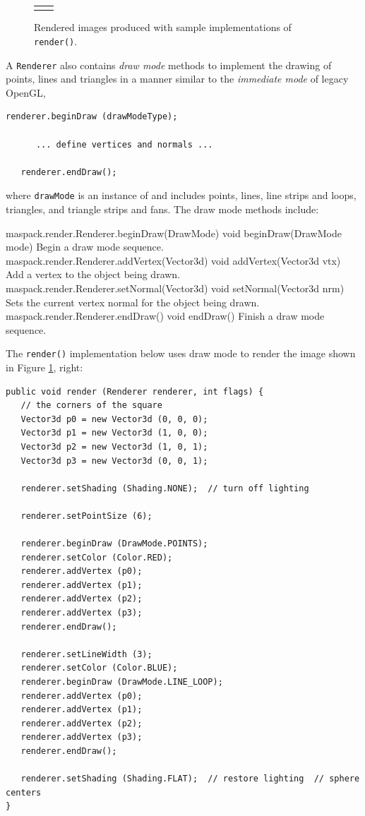 \begin{figure}[ht]
\begin{center}
\begin{tabular}{cc}
\fi
\end{tabular}
\end{center}
\caption{Rendered images produced with sample implementations of {\tt render()}.}
\label{renderExamples:fig}
\end{figure}

A {\tt Renderer} also contains {\it draw mode} methods to implement the drawing of points,
lines and triangles in a manner similar to the {\it immediate mode} of legacy OpenGL,
%
\begin{lstlisting}[]
   renderer.beginDraw (drawModeType);

      ... define vertices and normals ...

   renderer.endDraw();
\end{lstlisting}
%
where {\tt drawMode} is an instance
of  and includes points,
lines, line strips and loops, triangles, and triangle strips and
fans. The draw mode methods include:
%
\begin{methodtable}{0.48}{0.52}
\midline
%
\methodentry
{maspack.render.Renderer.beginDraw(DrawMode)}%
{void beginDraw(DrawMode mode)}%
{Begin a draw mode sequence.}%
%
\methodentry
{maspack.render.Renderer.addVertex(Vector3d)}%
{void addVertex(Vector3d vtx)}%
{Add a vertex to the object being drawn.}%
%
\methodentry
{maspack.render.Renderer.setNormal(Vector3d)}%
{void setNormal(Vector3d nrm)}%
{Sets the current vertex normal for the object being drawn.}%
%
\methodentry
{maspack.render.Renderer.endDraw()}%
{void endDraw()}%
{Finish a draw mode sequence.}%
%
\midline
\end{methodtable}
%
The {\tt render()} implementation below uses draw mode to
render the image shown in Figure \ref{renderExamples:fig}, right:
%
\begin{lstlisting}[]
public void render (Renderer renderer, int flags) {
   // the corners of the square
   Vector3d p0 = new Vector3d (0, 0, 0);
   Vector3d p1 = new Vector3d (1, 0, 0);
   Vector3d p2 = new Vector3d (1, 0, 1);
   Vector3d p3 = new Vector3d (0, 0, 1);
   
   renderer.setShading (Shading.NONE);  // turn off lighting

   renderer.setPointSize (6);

   renderer.beginDraw (DrawMode.POINTS);
   renderer.setColor (Color.RED);
   renderer.addVertex (p0);
   renderer.addVertex (p1);
   renderer.addVertex (p2);
   renderer.addVertex (p3);
   renderer.endDraw();

   renderer.setLineWidth (3);
   renderer.setColor (Color.BLUE);
   renderer.beginDraw (DrawMode.LINE_LOOP);
   renderer.addVertex (p0);
   renderer.addVertex (p1);
   renderer.addVertex (p2);
   renderer.addVertex (p3);
   renderer.endDraw();

   renderer.setShading (Shading.FLAT);  // restore lighting  // sphere centers
}
\end{lstlisting}
